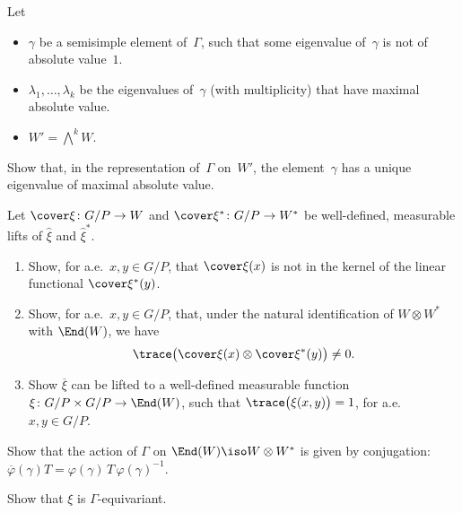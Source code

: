 \begin{exercises}

\item \label{UniqMaxEigEx}
Let 
	\begin{itemize}
	\item $\gamma$ be a semisimple element of~$\Gamma$, such that some eigenvalue of~$\gamma$ is not of absolute value~$1$. 
	\item $\lambda_1,\ldots,\lambda_k$ be the eigenvalues of~$\gamma$ (with multiplicity) that have maximal absolute value.
	\item $W' = \bigwedge^k W$.
	\end{itemize}
Show that, in the representation of~$\Gamma$ on~$W'$, the element~$\gamma$ has a unique eigenvalue of maximal absolute value.

\item \label{trace(xi)=1Ex}
Let $\cover\xi \colon G/P \to W$ and $\cover\xi^* \colon G/P \to W^*$ be well-defined, measurable lifts of $\widehat\xi$ and $\widehat\xi^*$. 
	\begin{enumerate}
	\item Show, for a.e.\ $x,y \in G/P$, that $\cover\xi(x)$ is not in the kernel of the linear functional $\cover\xi^*(y)$.
	\item Show, for a.e.\ $x,y \in G/P$, that, under the natural identification of $W \otimes W^*$ with $\End(W)$, we have 
		$$\trace \bigl( \cover\xi(x) \otimes \cover\xi^*(y) \bigr) \neq 0 .$$
	\item Show $\overline\xi$ can be lifted to a well-defined measurable function $\xi \colon G/P \times G/P \to \End(W)$, such that $\trace \bigl( \xi(x,y) \bigr) = 1$, for a.e.\ $x,y \in G/P$.
	\end{enumerate}

\item \label{GammaOnEnd(W)ConjEx}
Show that the action of $\Gamma$ on $\End(W) \iso W \otimes W^*$ is given by conjugation:
	$ \overline\varphi(\gamma) T = \varphi(\gamma) \, T \, \varphi(\gamma)^{-1} $.

\item \label{XiGammaEquiEx}
Show that $\xi$ is $\Gamma$-equivariant.


\end{exercises}
